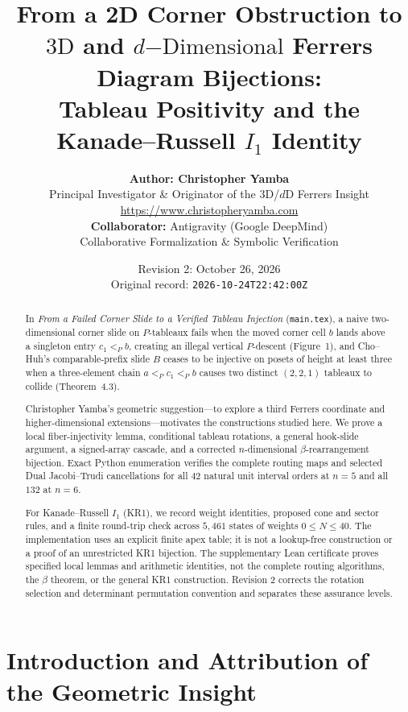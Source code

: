 \documentclass[11pt]{article}
\title{\textbf{From a 2D Corner Obstruction to $3\mathrm{D}$ and $d\mathrm{-Dimensional}$ Ferrers Diagram Bijections:\\
Tableau Positivity and the Kanade--Russell $I_1$ Identity}}
\author{\textbf{Author: Christopher Yamba}\\
\small Principal Investigator \& Originator of the $3\mathrm{D}$/$d\mathrm{D}$ Ferrers Insight\\
\small \url{https://www.christopheryamba.com}
\\[6pt]
\small \textbf{Collaborator:} Antigravity (Google DeepMind)\\
\small \footnotesize Collaborative Formalization \& Symbolic Verification}
\date{Revision 2: October 26, 2026\\\small Original record: \texttt{2026-10-24T22:42:00Z}}
\theoremstyle{definition}
\begin{document}
\maketitle

\begin{abstract}
In \emph{From a Failed Corner Slide to a Verified Tableau Injection} (\texttt{main.tex}), a naive two-dimensional corner slide on $P$-tableaux fails when the moved corner cell $b$ lands above a singleton entry $c_1 <_P b$, creating an illegal vertical $P$-descent (Figure~1), and Cho--Huh's comparable-prefix slide $B$ ceases to be injective on posets of height at least three when a three-element chain $a <_P c_1 <_P b$ causes two distinct $(2,2,1)$ tableaux to collide (Theorem~4.3).

Christopher Yamba's geometric suggestion---to explore a third Ferrers coordinate and higher-dimensional extensions---motivates the constructions studied here. We prove a local fiber-injectivity lemma, conditional tableau rotations, a general hook-slide argument, a signed-array cascade, and a corrected $n$-dimensional $\beta$-rearrangement bijection. Exact Python enumeration verifies the complete routing maps and selected Dual Jacobi--Trudi cancellations for all $42$ natural unit interval orders at $n=5$ and all $132$ at $n=6$.

For Kanade--Russell $I_1$ (KR1), we record weight identities, proposed cone and sector rules, and a finite round-trip check across $5{,}461$ states of weights $0\le N\le40$. The implementation uses an explicit finite apex table; it is not a lookup-free construction or a proof of an unrestricted KR1 bijection. The supplementary Lean certificate proves specified local lemmas and arithmetic identities, not the complete routing algorithms, the $\beta$ theorem, or the general KR1 construction. Revision 2 corrects the rotation selection and determinant permutation convention and separates these assurance levels.
\end{abstract}

\tableofcontents

\section{Introduction and Attribution of the Geometric Insight}
\end{document}
